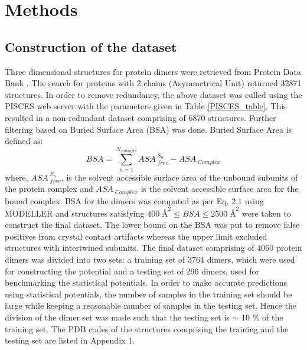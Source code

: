 
\chapter{Methods}
\label{Methods}

\pagestyle{fancy}

\raggedbottom


\fancyhf{}
\fancyfoot[RO,LE]{\thepage}

\section{Construction of the dataset}
Three dimensional structures for protein dimers were retrieved from Protein Data Bank \citep{Berman2000}. The search for proteins with 2 chains (Asymmetrical Unit) returned 32871 structures. In order to remove redundancy, the above dataset was culled using the PISCES web server \citep{Wang2005} with the parameters given in Table \ref{PISCES_table}. This resulted in a non-redundant dataset comprising of 6870 structures. Further filtering based on Buried Surface Area (BSA) was done.  Buried Surface Area is defined as:
\begin{equation}
BSA =  \sum\limits_{n = 1}^{N_{subunits}} ASA_{\;free}^{\;S_{n}} - ASA_{\;Complex}
\end{equation}
where, $ASA_{\;free}^{\;S_{n}}$, is the solvent accessible surface area of the unbound subunits of the protein complex and $ASA_{\;Complex}$ is the solvent accessible surface area for the bound complex. BSA for the dimers was computed as per Eq. 2.1 using MODELLER \citep{Sali1993} and structures satisfying $400 \; \si{\angstrom}^2 \leq BSA \leq 2500 \; \si{\angstrom}^2$ were taken to construct the final dataset. The lower bound on the BSA was put to remove false positives from crystal contact artifacts whereas the upper limit excluded structures with intertwined subunits. The final dataset comprising of 4060 protein dimers was divided into two sets: a training set of 3764 dimers, which were used for constructing the potential and a testing set of 296 dimers, used for benchmarking the statistical potentials. In order to make accurate predictions using statistical potentials, the number of samples in the training set should be large while keeping a reasonable number of samples in the testing set. Hence the division of the dimer set was made such that the testing set is $\sim$ 10 \% of the training set. The PDB codes of the structures comprising the training and the testing set are listed in Appendix 1.

